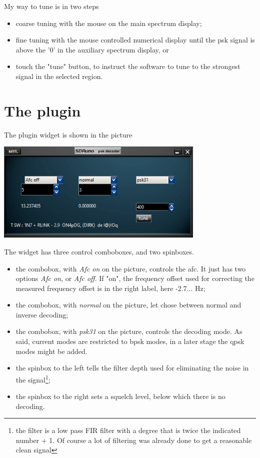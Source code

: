 \documentclass[11pt]{article}
\begin{document}
My way to tune is in two steps
\begin{itemize}
\item coarse tuning with the mouse on the main spectrum display;
\item fine tuning with the mouse controlled numerical display until the
psk signal is above the '0' in the auxiliary spectrum display, or
\item touch the "tune" button, to instruct the software to tune to the
strongest signal in the selected region.
\end{itemize}

\section{The plugin}
The plugin widget  is shown in the picture

\includegraphics[width=100mm]{psk-plugin-widget.png}

The widget has three control comboboxes, and two spinboxes.

\begin{itemize}
\item the combobox, with {\em Afc on} on the picture, controls the afc. 
It just has two options {\em Afc on}, or {\em Afc off}. If "on", the
frequency offset used for correcting the measured frequency offset is
in the right label, here -2.7... Hz;
\item the combobox, with {\em normal} on the picture, let chose between
normal and inverse decoding;
\item the combobox, with {\em psk31} on the picture, controls the decoding mode.
As said, current modes are restricted to bpsk modes, in a later stage
the qpsk modes might be added.
\item the spinbox to the left tells the filter depth used for eliminating
the noise in the signal\footnote{the filter is a low pass FIR filter with
a degree that is twice the indicated number + 1. Of course a lot of filtering
was already done to get a reasonable clean signal};
\item the spinbox to the right sets a squelch level, below which there
is no decoding.
\end{itemize}
\end{document}
